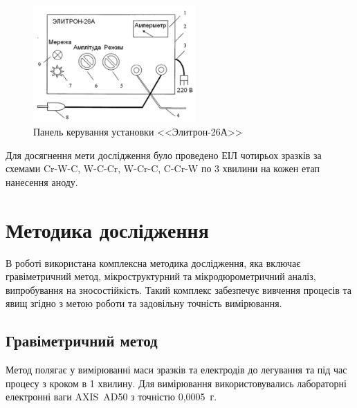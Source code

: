 \documentclass[a4paper,fontsize=14bp,ukrainian]{extreport}
\begin{document}
\begin{figure}[H]
\centering
\includegraphics[width=0.55\textwidth]{elitron_face.png}
\caption{Панель керування установки <<Элитрон-26А>>~\cite{ivanov2016}}
\label{fig:elitron_face}
\end{figure}

Для досягнення мети дослідження було проведено ЕІЛ чотирьох зразків за схемами Cr-W-C, W-C-Cr, W-Cr-C, C-Cr-W по 3 хвилини на кожен етап нанесення аноду.

\section{Методика дослідження}

В роботі використана комплексна методика дослідження, яка включає гравіметричний метод, мікроструктурний та мікродюрометричний аналіз, випробування на зносостійкість. Такий комплекс забезпечує вивчення процесів та явищ згідно з метою роботи та задовільну точність вимірювання.

\subsection{Гравіметричний метод}
\label{subsec:method_gravi}

Метод полягає у вимірюванні маси зразків та електродів до легування та під час процесу з кроком в 1 хвилину. Для вимірювання використовувались лабораторні електронні ваги AXIS~AD50 з точністю 0,0005~г.
\end{document}
